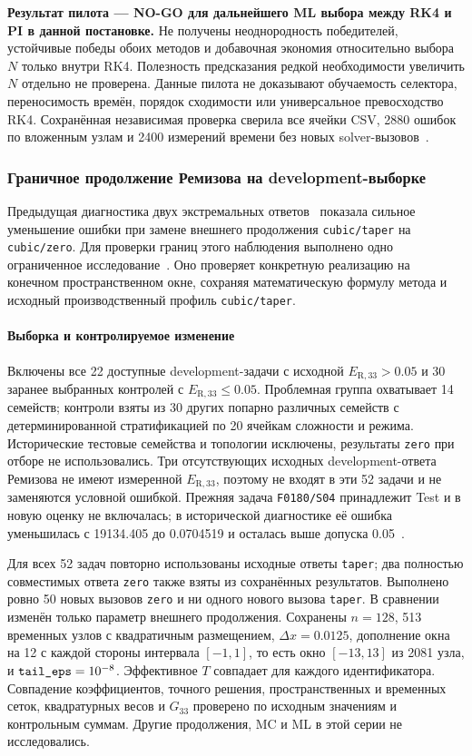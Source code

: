 \documentclass[14pt,a4paper]{extarticle}
\DeclareRobustCommand{\code}[1]{\texttt{\let\savedunderscore\_\def\_{\savedunderscore\allowbreak}#1}}
\begin{document}
\textbf{Результат пилота --- NO-GO для дальнейшего ML выбора между RK4
и PI в данной постановке.} Не получены неоднородность победителей,
устойчивые победы обоих методов и добавочная экономия относительно
выбора $N$ только внутри RK4. Полезность предсказания редкой необходимости
увеличить $N$ отдельно не проверена. Данные пилота не доказывают
обучаемость селектора, переносимость времён, порядок сходимости или
универсальное превосходство RK4. Сохранённая независимая проверка
сверила все ячейки CSV, 2880 ошибок по вложенным узлам и 2400 измерений
времени без новых solver-вызовов~\cite{savedcost60}.

\clearpage
\subsubsection{Граничное продолжение Ремизова на development-выборке}
\label{sec:boundarydev}

Предыдущая диагностика двух экстремальных ответов~\cite{savedboundary}
показала сильное уменьшение ошибки при замене внешнего продолжения
\code{cubic/taper} на \code{cubic/zero}. Для проверки границ этого
наблюдения выполнено одно ограниченное исследование~\cite{savedboundarydev}.
Оно проверяет конкретную реализацию на конечном пространственном окне,
сохраняя математическую формулу метода и исходный производственный
профиль \code{cubic/taper}.

\paragraph{Выборка и контролируемое изменение\\}
Включены все 22 доступные development-задачи с исходной
$E_{\mathrm{R},33}>0.05$ и 30 заранее выбранных контролей с
$E_{\mathrm{R},33}\le0.05$. Проблемная группа охватывает 14 семейств;
контроли взяты из 30 других попарно различных семейств с
детерминированной стратификацией по 20 ячейкам сложности и режима.
Исторические тестовые семейства и топологии исключены, результаты
\code{zero} при отборе не использовались. Три отсутствующих исходных
development-ответа Ремизова не имеют измеренной $E_{\mathrm{R},33}$,
поэтому не входят в эти 52 задачи и не заменяются условной ошибкой.
Прежняя задача \code{F0180/S04} принадлежит Test и в новую оценку не
включалась; в исторической диагностике её ошибка уменьшилась с
19134.405 до 0.0704519 и осталась выше допуска 0.05~\cite{savedboundary}.

Для всех 52 задач повторно использованы исходные ответы \code{taper};
два полностью совместимых ответа \code{zero} также взяты из сохранённых
результатов. Выполнено ровно 50 новых вызовов \code{zero} и ни одного
нового вызова \code{taper}. В сравнении изменён только параметр внешнего
продолжения. Сохранены $n=128$, 513 временных узлов с квадратичным
размещением, $\Delta x=0.0125$, дополнение окна на 12 с каждой стороны
интервала $[-1,1]$, то есть окно $[-13,13]$ из 2081 узла,
и $\code{tail\_eps}=10^{-8}$. Эффективное $T$ совпадает для каждого
идентификатора. Совпадение коэффициентов, точного решения,
пространственных и временных сеток, квадратурных весов и $G_{33}$
проверено по исходным значениям и контрольным суммам. Другие продолжения,
MC и ML в этой серии не исследовались.
\end{document}
